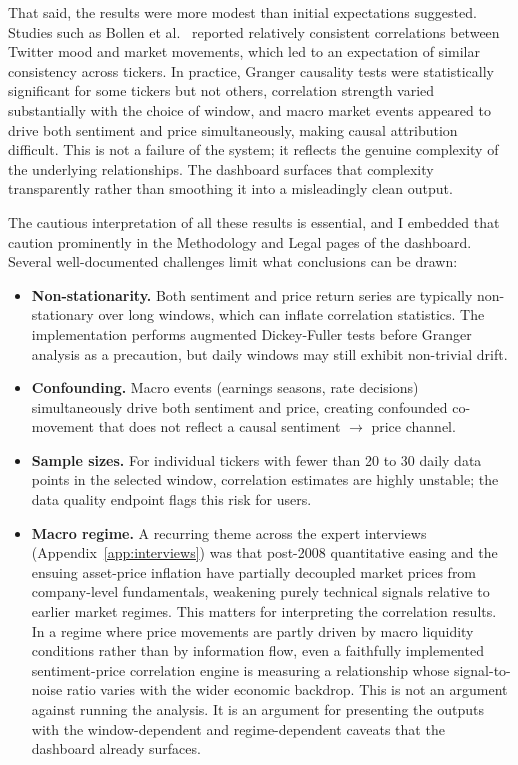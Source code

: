 That said, the results were more modest than initial expectations suggested. Studies such as Bollen et al.\ \citeyear{bollen2011twitter} reported relatively consistent correlations between Twitter mood and market movements, which led to an expectation of similar consistency across tickers. In practice, Granger causality tests were statistically significant for some tickers but not others, correlation strength varied substantially with the choice of window, and macro market events appeared to drive both sentiment and price simultaneously, making causal attribution difficult. This is not a failure of the system; it reflects the genuine complexity of the underlying relationships. The dashboard surfaces that complexity transparently rather than smoothing it into a misleadingly clean output.

The cautious interpretation of all these results is essential, and I embedded that caution prominently in the Methodology and Legal pages of the dashboard. Several well-documented challenges limit what conclusions can be drawn:

\begin{itemize}
    \item \textbf{Non-stationarity.}  Both sentiment and price return series are typically non-stationary over long windows, which can inflate correlation statistics.  The implementation performs augmented Dickey-Fuller tests before Granger analysis as a precaution, but daily windows may still exhibit non-trivial drift.
    \item \textbf{Confounding.}  Macro events (earnings seasons, rate decisions) simultaneously drive both sentiment and price, creating confounded co-movement that does not reflect a causal sentiment $\to$ price channel.
    \item \textbf{Sample sizes.}  For individual tickers with fewer than 20 to 30 daily data points in the selected window, correlation estimates are highly unstable; the data quality endpoint flags this risk for users.
    \item \textbf{Macro regime.}  A recurring theme across the expert interviews (Appendix~\ref{app:interviews}) was that post-2008 quantitative easing and the ensuing asset-price inflation have partially decoupled market prices from company-level fundamentals, weakening purely technical signals relative to earlier market regimes. This matters for interpreting the correlation results. In a regime where price movements are partly driven by macro liquidity conditions rather than by information flow, even a faithfully implemented sentiment-price correlation engine is measuring a relationship whose signal-to-noise ratio varies with the wider economic backdrop. This is not an argument against running the analysis. It is an argument for presenting the outputs with the window-dependent and regime-dependent caveats that the dashboard already surfaces.
\end{itemize}

